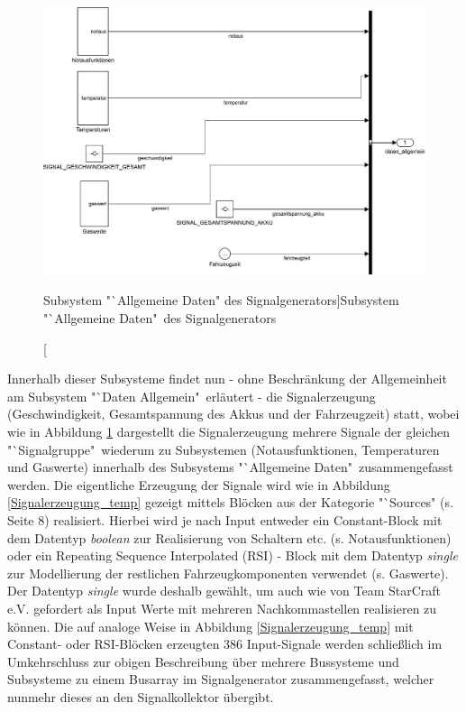 \documentclass[fontsize = 12pt, paper = a4]{scrreprt}
\begin{document}
\begin{figure}[h]
\centering
\includegraphics[scale = 0.65]{suballgemein}
\caption[Subsystem "`Allgemeine Daten" des Signalgenerators]{Subsystem "`Allgemeine Daten"\ des Signalgenerators}
\label{Signalgenerator}
\end{figure}

Innerhalb dieser Subsysteme findet nun - ohne Beschränkung der Allgemeinheit am Subsystem "`Daten Allgemein"\ erläutert - die Signalerzeugung (Geschwindigkeit, Gesamtspannung des Akkus und der Fahrzeugzeit) statt, wobei wie in Abbildung \ref{Signalgenerator} dargestellt die Signalerzeugung mehrere Signale der gleichen "`Signalgruppe"\ wiederum zu Subsystemen (Notausfunktionen, Temperaturen und Gaswerte)  innerhalb des Subsystems "`Allgemeine Daten"\ zusammengefasst werden. Die eigentliche Erzeugung der Signale wird wie in Abbildung \ref{Signalerzeugung_temp} gezeigt mittels Blöcken aus der Kategorie "`Sources" (s. Seite 8) realisiert. Hierbei wird je nach Input entweder ein Constant-Block mit dem Datentyp \textit{boolean} zur Realisierung von Schaltern etc. (s. Notausfunktionen) oder ein Repeating Sequence Interpolated (RSI) - Block mit dem Datentyp \textit{single} zur Modellierung der restlichen Fahrzeugkomponenten verwendet (s. Gaswerte). Der Datentyp \textit{single} wurde deshalb gewählt, um auch wie von Team StarCraft e.V. gefordert als Input Werte mit mehreren Nachkommastellen realisieren zu können. Die auf analoge Weise in Abbildung \ref{Signalerzeugung_temp} mit Constant- oder RSI-Blöcken erzeugten 386 Input-Signale werden schließlich im Umkehrschluss zur obigen Beschreibung über mehrere Bussysteme und Subsysteme zu einem Busarray im Signalgenerator zusammengefasst, welcher nunmehr dieses an den Signalkollektor übergibt.   
\end{document}
